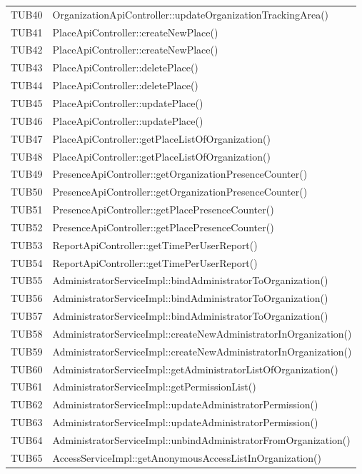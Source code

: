 {\begin{longtable}{C{2cm} C{12cm}}
		TUB40 & OrganizationApiController::updateOrganizationTrackingArea()\\
		TUB41 & PlaceApiController::createNewPlace()\\
		TUB42 & PlaceApiController::createNewPlace()\\
		TUB43 & PlaceApiController::deletePlace()\\
		TUB44 & PlaceApiController::deletePlace()\\
		TUB45 & PlaceApiController::updatePlace()\\
		TUB46 & PlaceApiController::updatePlace()\\
		TUB47 & PlaceApiController::getPlaceListOfOrganization()\\
		TUB48 & PlaceApiController::getPlaceListOfOrganization()\\
		TUB49 & PresenceApiController::getOrganizationPresenceCounter()\\
		TUB50 & PresenceApiController::getOrganizationPresenceCounter()\\
		TUB51 & PresenceApiController::getPlacePresenceCounter()\\
		TUB52 & PresenceApiController::getPlacePresenceCounter()\\
		TUB53 & ReportApiController::getTimePerUserReport()\\
		TUB54 & ReportApiController::getTimePerUserReport()\\
		TUB55 & AdministratorServiceImpl::bindAdministratorToOrganization()\\
		TUB56 & AdministratorServiceImpl::bindAdministratorToOrganization()\\
		TUB57 & AdministratorServiceImpl::bindAdministratorToOrganization()\\
		TUB58 & AdministratorServiceImpl::createNewAdministratorInOrganization()\\
		TUB59 & AdministratorServiceImpl::createNewAdministratorInOrganization()\\
		TUB60 & AdministratorServiceImpl::getAdministratorListOfOrganization()\\
		TUB61 & AdministratorServiceImpl::getPermissionList()\\
		TUB62 & AdministratorServiceImpl::updateAdministratorPermission()\\
		TUB63 & AdministratorServiceImpl::updateAdministratorPermission()\\
		TUB64 & AdministratorServiceImpl::unbindAdministratorFromOrganization()\\
		TUB65 & AccessServiceImpl::getAnonymousAccessListInOrganization()\\

\end{longtable}}
